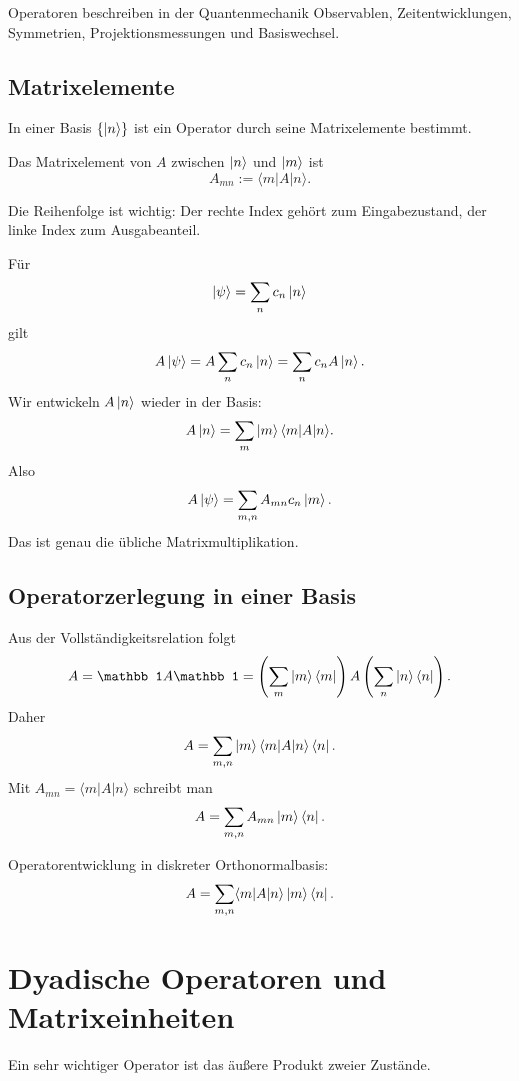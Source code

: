 Operatoren beschreiben in der Quantenmechanik Observablen, Zeitentwicklungen, Symmetrien, Projektionsmessungen und Basiswechsel.

\subsection{Matrixelemente}

In einer Basis $\{\left|n\right\rangle\}$ ist ein Operator durch seine Matrixelemente bestimmt.

\begin{definitionbox}
Das Matrixelement von $A$ zwischen $\left|n\right\rangle$ und $\left|m\right\rangle$ ist
\[
    A_{mn}:=\langle m|A|n\rangle.
\]
\end{definitionbox}

Die Reihenfolge ist wichtig: Der rechte Index gehört zum Eingabezustand, der linke Index zum Ausgabeanteil.

\begin{derivationbox}
Für
\[
    \left|\psi\right\rangle=\sum_n c_n\left|n\right\rangle
\]
gilt
\[
    A\left|\psi\right\rangle=A\sum_n c_n\left|n\right\rangle=\sum_n c_n A\left|n\right\rangle.
\]
Wir entwickeln $A\left|n\right\rangle$ wieder in der Basis:
\[
    A\left|n\right\rangle=\sum_m \left|m\right\rangle\langle m|A|n\rangle.
\]
Also
\[
    A\left|\psi\right\rangle=\sum_{m,n}A_{mn}c_n\left|m\right\rangle.
\]
Das ist genau die übliche Matrixmultiplikation.
\end{derivationbox}

\subsection{Operatorzerlegung in einer Basis}

Aus der Vollständigkeitsrelation folgt
\[
    A=\mathbb 1 A\mathbb 1
    =\left(\sum_m\ket m\bra m\right)A\left(\sum_n\ket n\bra n\right).
\]
Daher
\[
    A=\sum_{m,n}\left|m\right\rangle\langle m|A|n\rangle\left\langle n\right|.
\]
Mit $A_{mn}=\langle m|A|n\rangle$ schreibt man
\[
    A=\sum_{m,n}A_{mn}\left|m\right\rangle\left\langle n\right|.
\]

\begin{formulabox}
Operatorentwicklung in diskreter Orthonormalbasis:
\[
    A=\sum_{m,n}\langle m|A|n\rangle\left|m\right\rangle\left\langle n\right|.
\]
\end{formulabox}

\section{Dyadische Operatoren und Matrixeinheiten}

Ein sehr wichtiger Operator ist das äußere Produkt zweier Zustände.

